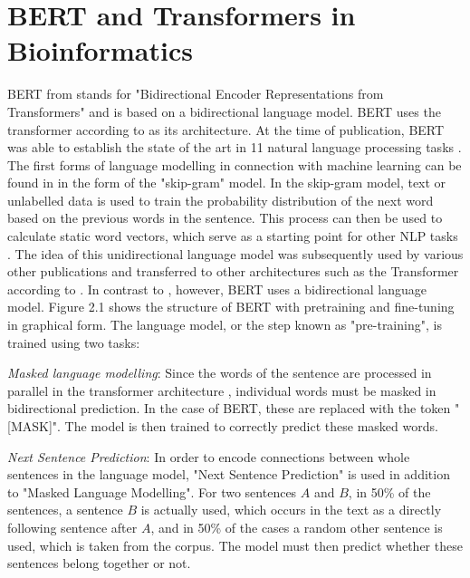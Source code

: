 \section{BERT and Transformers in Bioinformatics}


BERT from \cite{Devlin2019} stands for "Bidirectional Encoder Representations from Transformers" and is based on a bidirectional language model. BERT uses the transformer according to \cite{Vaswani2017} as its architecture. At the time of publication, BERT was able to establish the state of the art in 11 natural language processing tasks \citep{Devlin2019}. The first forms of language modelling in connection with machine learning can be found in \cite{Mikolov2013} in the form of the "skip-gram" model. In the skip-gram model, text or unlabelled data is used to train the probability distribution of the next word based on the previous words in the sentence. This process can then be used to calculate static word vectors, which serve as a starting point for other NLP tasks \citep{Mikolov2013a}. The idea of this unidirectional language model was subsequently used by various other publications and transferred to other architectures such as the Transformer according to \cite{Vaswani2017} \citep{Radford2018ImprovingLU}. In contrast to \cite{Radford2018ImprovingLU}, however, BERT uses a bidirectional language model. Figure 2.1 shows the structure of BERT with pretraining and fine-tuning in graphical form. The language model, or the step known as "pre-training", is trained using two tasks:

\textit{Masked language modelling}: Since the words of the sentence are processed in parallel in the transformer architecture \cite{Vaswani2017}, individual words must be masked in bidirectional prediction. In the case of BERT, these are replaced with the token "[MASK]". The model is then trained to correctly predict these masked words.

\textit{Next Sentence Prediction}: In order to encode connections between whole sentences in the language model, "Next Sentence Prediction" is used in addition to "Masked Language Modelling". For two sentences $A$ and $B$, in 50\% of the sentences, a sentence $B$ is actually used, which occurs in the text as a directly following sentence after $A$, and in 50\% of the cases a random other sentence is used, which is taken from the corpus. The model must then predict whether these sentences belong together or not.

